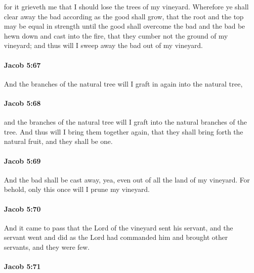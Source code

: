 			for it grieveth me that I should lose the trees of my vineyard.
			Wherefore ye shall clear away the bad according as the good shall grow,
			that the root and the top may be equal in strength
			until the good shall overcome the bad
			and the bad be hewn down and cast into the fire,
			that they cumber not the ground of my vineyard;
			and thus will I sweep away the bad out of my vineyard.

		\paragraph{Jacob 5:67} %
			\label{JACOB-5-67}

			And the branches of the natural tree will I graft in again into the natural tree,

		\paragraph{Jacob 5:68} %
			\label{JACOB-5-68}

			and the branches of the natural tree will I graft into the natural branches of the tree.
			And thus will I bring them together again,
			that they shall bring forth the natural fruit,
			and they shall be one.

		\paragraph{Jacob 5:69} %
			\label{JACOB-5-69}

			And the bad shall be cast away,
			yea, even out of all the land of my vineyard.
			For behold, only this once will I prune my vineyard.

		\paragraph{Jacob 5:70} %
			\label{JACOB-5-70}

			And it came to pass that the Lord of the vineyard sent his servant,
			and the servant went and did as the Lord had commanded him
			and brought other servants, and they were few.

		\paragraph{Jacob 5:71} %
			\label{JACOB-5-71}

